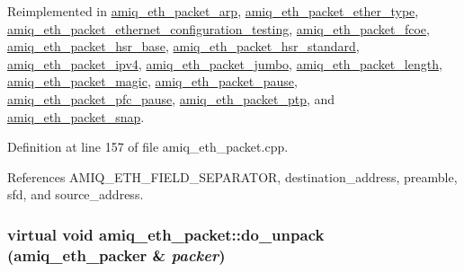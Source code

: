 Reimplemented in \hyperlink{classamiq__eth__packet__arp_abbb862d7b7abe9b1c6d49455f80f6921}{amiq\_\-eth\_\-packet\_\-arp}, \hyperlink{classamiq__eth__packet__ether__type_a9b2852fa1aaf278138fde2232e446f63}{amiq\_\-eth\_\-packet\_\-ether\_\-type}, \hyperlink{classamiq__eth__packet__ethernet__configuration__testing_aaac4abb2c0104900e30360871e01bbbd}{amiq\_\-eth\_\-packet\_\-ethernet\_\-configuration\_\-testing}, \hyperlink{classamiq__eth__packet__fcoe_a39fa215f83aa71ff06c5fd699de8e427}{amiq\_\-eth\_\-packet\_\-fcoe}, \hyperlink{classamiq__eth__packet__hsr__base_a83b7ccb4b601e00ba5cfbbfde6658632}{amiq\_\-eth\_\-packet\_\-hsr\_\-base}, \hyperlink{classamiq__eth__packet__hsr__standard_abaa39d881f90e05ae4acbb7fe5ebca0d}{amiq\_\-eth\_\-packet\_\-hsr\_\-standard}, \hyperlink{classamiq__eth__packet__ipv4_a5e93e2455918061cdc524f30626d4043}{amiq\_\-eth\_\-packet\_\-ipv4}, \hyperlink{classamiq__eth__packet__jumbo_a744d47397c29884a7da15e5582b331a2}{amiq\_\-eth\_\-packet\_\-jumbo}, \hyperlink{classamiq__eth__packet__length_a2caccb08da11dbb3ab39178bc41bca75}{amiq\_\-eth\_\-packet\_\-length}, \hyperlink{classamiq__eth__packet__magic_a57354d611adb80b1a8f4ad00c4f307a3}{amiq\_\-eth\_\-packet\_\-magic}, \hyperlink{classamiq__eth__packet__pause_a7ea960bd9c079375b0d4cd72a762d695}{amiq\_\-eth\_\-packet\_\-pause}, \hyperlink{classamiq__eth__packet__pfc__pause_a58c67ea445a72bc6c1c584625d642899}{amiq\_\-eth\_\-packet\_\-pfc\_\-pause}, \hyperlink{classamiq__eth__packet__ptp_a52db9ab62ab743317a7ca4745a823a82}{amiq\_\-eth\_\-packet\_\-ptp}, and \hyperlink{classamiq__eth__packet__snap_af0ca9e38d460f39767d5abf60f48cee9}{amiq\_\-eth\_\-packet\_\-snap}.

Definition at line 157 of file amiq\_\-eth\_\-packet.cpp.

References AMIQ\_\-ETH\_\-FIELD\_\-SEPARATOR, destination\_\-address, preamble, sfd, and source\_\-address.\hypertarget{classamiq__eth__packet_a909eb3860185125564fa530496ed1c9e}{
\subsubsection[{do\_\-unpack}]{\setlength{\rightskip}{0pt plus 5cm}virtual void amiq\_\-eth\_\-packet::do\_\-unpack ({\bf amiq\_\-eth\_\-packer} \& {\em packer})}}
\label{classamiq__eth__packet_a909eb3860185125564fa530496ed1c9e}


